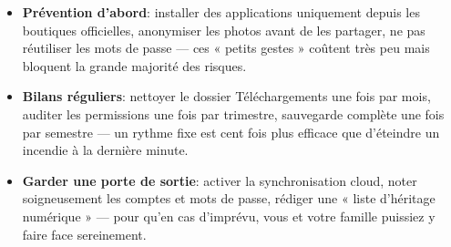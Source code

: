 \begin{itemize}
  \item \textbf{Prévention d'abord}: installer des applications uniquement depuis les boutiques officielles, anonymiser les photos avant de les partager, ne pas réutiliser les mots de passe — ces « petits gestes » coûtent très peu mais bloquent la grande majorité des risques.
  \item \textbf{Bilans réguliers}: nettoyer le dossier Téléchargements une fois par mois, auditer les permissions une fois par trimestre, sauvegarde complète une fois par semestre — un rythme fixe est cent fois plus efficace que d'éteindre un incendie à la dernière minute.
  \item \textbf{Garder une porte de sortie}: activer la synchronisation cloud, noter soigneusement les comptes et mots de passe, rédiger une « liste d'héritage numérique » — pour qu'en cas d'imprévu, vous et votre famille puissiez y faire face sereinement.
\end{itemize}
